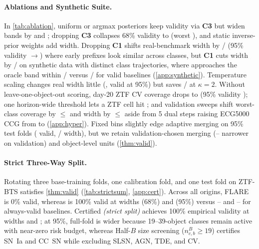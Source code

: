 \paragraph{Ablations and Synthetic Suite.}
In \cref{tab:ablation}, uniform or argmax posteriors keep validity via \textbf{C3} but widen bands by \AblWidthUniform{} and \AblWidthArgmax{}; dropping \textbf{C3} collapses 68\% validity to \AblValidMixtureSixtyeight{} (worst \AblWorstMixtureSixtyeight{}), and static inverse-prior weights add \AblWidthBalanced{} width.
Dropping \textbf{C1} shifts real-benchmark width by \AblWNoConeSixtyeight{}/\AblWNoConeNinetyfive{} (95\% validity \MainValidGamutNinetyfive{}$\to$\AblValidNoConeNinetyfive{}) where early prefixes look similar across classes, but \textbf{C1} cuts width by \AblConeSynSixtyeight{}/\AblConeSynNinetyfive{} on synthetic data with distinct class trajectories, where \gamut{} approaches the oracle band within \SynOracleGapSixtyeight{}/\SynOracleGapNinetyfive{} versus \SynOracleGapValidSixtyeight{}/\SynOracleGapValidNinetyfive{} for valid baselines (\cref{app:synthetic}).
Temperature scaling changes real width little (\AblWRawSixtyeight{}, \AblValidRawNinetyfive{} valid at 95\%) but saves \AblRawKtwoSixtyeight{}/\AblRawKtwoNinetyfive{} at $\kappa=2$.
Without leave-one-object-out scoring, day-20 ZTF CV coverage drops to \AblWorstNoLooZTF{} (95\% validity \AblValidNoLooNinetyfive{}); one horizon-wide threshold lets a ZTF cell hit \AblOneThreshWorstCell{}; and validation sweeps shift worst-class coverage by $\le$\HyperMaxWorstChange{} and width by $\le$\HyperMaxWidthChange{} aside from 5 dual steps raising ECG5000 CCG from \HyperDualFiveCCGFrom{} to \HyperDualFiveCCGTo{} (\cref{app:hyper}). Fixed bins slightly edge adaptive merging on 95\% test folds (\AblValidFixedBinsNinetyfive{} valid, \AblWFixedBinsSixtyeight{}/\AblWFixedBinsNinetyfive{} width), but we retain validation-chosen merging (\HyperFixedBinsWidthMin{}--\HyperFixedBinsWidthMax{} narrower on validation) and object-level units (\cref{thm:valid}).

\paragraph{Strict Three-Way Split.}
Rotating three base-training folds, one calibration fold, and one test fold on ZTF-BTS satisfies \cref{thm:valid} (\cref{tab:strictsum}, \cref{app:cert}).
Across all \StrictNOrigins{} origins, FLARE is 0\% valid, whereas \gamut{} is 100\% valid at widths \StrictWidthGamutSixtyeight{} (68\%) and \StrictWidthGamutNinetyfive{} (95\%) versus \StrictWidthTwoStepSixtyeight{}--\StrictWidthMDCPSixtyeight{} and \StrictWidthTwoStepNinetyfive{}--\StrictWidthMDCPNinetyfive{} for always-valid baselines.
Certified \emph{\gamut{} (strict split)} achieves 100\% empirical validity at widths \StrictWidthCertSixtyeight{} and \StrictWidthCertNinetyfive{}; at 95\%, full-fold \gamut{} is wider because 19--39-object classes remain active with near-zero risk budget, whereas Half-$B$ size screening ($n^B_{c,b}\ge19$) certifies SN~Ia and CC~SN while excluding SLSN, AGN, TDE, and CV.

